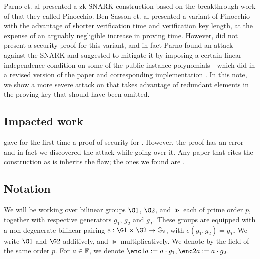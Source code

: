\documentclass[11pt]{article}
\numberwithin{figure}{section} %
\begin{document}
Parno et. al \cite{PGHR} presented a zk-SNARK construction based on the breakthrough work of \cite{GGPR} that they called Pinocchio.
Ben-Sasson et. al \cite{BCTV} presented a variant of Pinocchio with the advantage of shorter verification time and verification key length, at the expense of an arguably negligible increase in proving time. However, \cite{BCTV} did not present a security proof for this variant, and in fact Parno \cite{Parno15} found an attack against the \cite{BCTV} SNARK and suggested to mitigate it by imposing a certain linear independence condition on some of the public instance polynomials - which \cite{BCTV} did in a revised version of the paper and corresponding implementation \cite{libsnark}. In this note, we show a more severe attack on \cite{BCTV} that takes advantage of redundant elements in the proving key that should have been omitted.


\subsection{Impacted work}
\cite{BGG} gave for the first time a proof of security for \cite{BCTV}. However, the proof has an error and in fact we discovered the attack while going over it.
Any paper that cites the \cite{BCTV} construction as is inherits the flaw; the ones we found are \cite{Adsnark,Fuchsbauer18}.
% 



\subsection{Notation}
We will be working over bilinear groups $\G1$, $\G2$, and $\Gt$ each of prime order $p$, together with respective generators $g_1$, $g_2$ and $g_T$.
These groups are equipped with a non-degenerate bilinear pairing $e:\G1 \times \G2 \to \Gt$, with $e(g_1, g_2) = g_T$.
We write $\G1$ and $\G2$ additively, and $\Gt$ multiplicatively.
We denote by \F the field of the same order $p$.
For $a \in \mathbb F$, we denote $\enc1{a}\defeq a\cdot g_1, \enc2{a}\defeq a\cdot g_2$.
\end{document}
